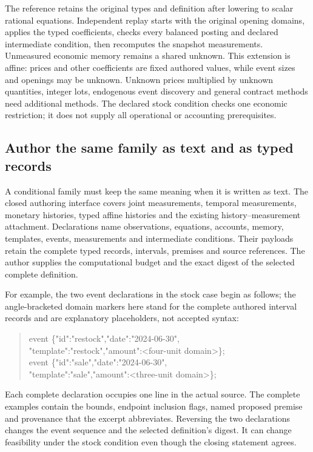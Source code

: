 The reference retains the original types and definition after lowering to
scalar rational equations. Independent replay starts with the original opening
domains, applies the typed coefficients, checks every balanced posting and
declared intermediate condition, then recomputes the snapshot measurements.
Unmeasured economic memory remains a shared unknown. This extension is affine:
prices and other coefficients are fixed authored values, while event sizes and
openings may be unknown. Unknown prices multiplied by unknown quantities,
integer lots, endogenous event discovery and general contract methods need
additional methods. The declared stock condition checks one economic
restriction; it does not supply all operational or accounting prerequisites.

\subsection{Author the same family as text and as typed records}

A conditional family must keep the same meaning when it is written as text.
The closed  authoring interface covers joint
measurements, temporal measurements, monetary histories, typed affine histories
and the existing history--measurement attachment. Declarations name observations,
equations, accounts, memory, templates, events, measurements and intermediate
conditions. Their payloads retain the complete typed records, intervals,
premises and source references. The author supplies the computational budget
and the exact digest of the selected complete definition.

For example, the two event declarations in the stock case begin as follows;
the angle-bracketed domain markers here stand for the complete authored interval
records and are explanatory placeholders, not accepted syntax:
\begin{quote}\small\ttfamily
event \{"id":"restock","date":"2024-06-30",\\
\hspace*{1em}"template":"restock","amount":<four-unit domain>\};\\
event \{"id":"sale","date":"2024-06-30",\\
\hspace*{1em}"template":"sale","amount":<three-unit domain>\};
\end{quote}
Each complete declaration occupies one line in the actual source. The complete
examples contain the bounds, endpoint inclusion flags, named proposed premise
and provenance that the excerpt abbreviates. Reversing the two declarations
changes the event sequence and the selected definition's digest. It can change
feasibility under the stock condition even though the closing statement agrees.

